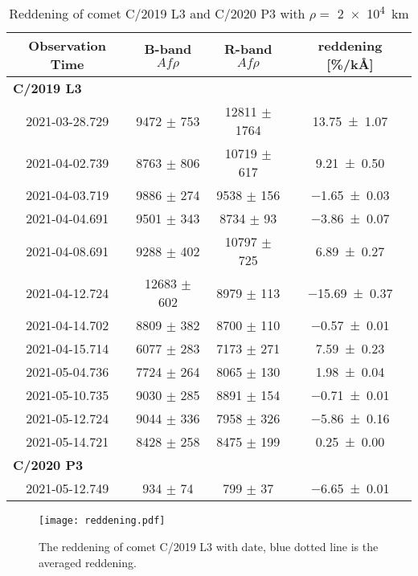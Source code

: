 \begin{table}[!htbp]
    \centering
    \caption{Reddening of comet C/2019 L3 and C/2020 P3 with $\rho = $ \SI{2e4}{\km} }\label{tab:reddening}
    \begin{threeparttable}
        \begin{tabular}{cccc}
            \toprule
            Observation Time & B-band $Af\rho$ & R-band $Af\rho$ & reddening [\si{\%/\kilo\angstrom}]\\
            \midrule
            \multicolumn{4}{l}{\textbf{C/2019 L3}} \\
            2021-03-28.729 & 9472 $\pm$ 753 & 12811 $\pm$ 1764 & \num{13.75 +- 1.07}\\
            2021-04-02.739 & 8763 $\pm$ 806 & 10719 $\pm$ 617 & \num{9.21 +- 0.50}\\
            2021-04-03.719 & 9886 $\pm$ 274 & 9538 $\pm$ 156 & \num{-1.65 +- 0.03}\\
            2021-04-04.691 & 9501 $\pm$ 343 & 8734 $\pm$ 93 & \num{-3.86 +- 0.07}\\
            2021-04-08.691 & 9288 $\pm$ 402 & 10797 $\pm$ 725 & \num{6.89 +- 0.27}\\
            2021-04-12.724 & 12683 $\pm$ 602 & 8979 $\pm$ 113 & \num{-15.69 +- 0.37}\\
            2021-04-14.702 & 8809 $\pm$ 382 & 8700 $\pm$ 110 & \num{-0.57 +- 0.01}\\
            2021-04-15.714 & 6077 $\pm$ 283 & 7173 $\pm$ 271 & \num{7.59 +- 0.23}\\
            2021-05-04.736 & 7724 $\pm$ 264 & 8065 $\pm$ 130 & \num{1.98 +- 0.04}\\
            2021-05-10.735 & 9030 $\pm$ 285 & 8891 $\pm$ 154 & \num{-0.71 +- 0.01}\\
            2021-05-12.724 & 9044 $\pm$ 336 & 7958 $\pm$ 326 & \num{-5.86 +- 0.16}\\
            2021-05-14.721 & 8428 $\pm$ 258 & 8475 $\pm$ 199 & \num{0.25 +- 0.00}\\
            \multicolumn{4}{l}{\textbf{C/2020 P3}} \\
            2021-05-12.749 & 934 $\pm$ 74 & 799 $\pm$ 37 & \num{-6.65 +- 0.01}\\
            \bottomrule
        \end{tabular}
    \end{threeparttable}
\end{table}

\begin{figure}[!htbp]
    \centering
    \texttt{[image: reddening.pdf]}
    \caption{The reddening of comet C/2019 L3 with date, blue dotted line is the averaged reddening. }\label{fig:reddening}
\end{figure}
